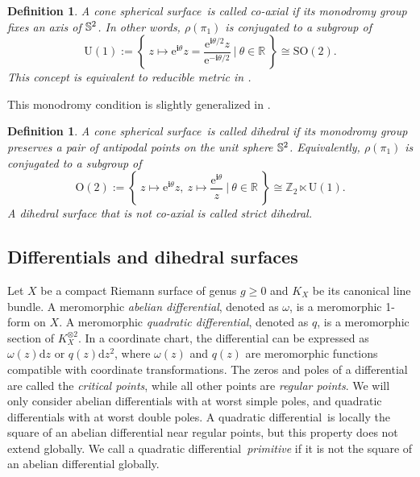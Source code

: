 \documentclass[pdflatex,sn-mathphys]{sn-jnl}%
\numberwithin{equation}{section}
\theoremstyle{thmstyleone}%
\newtheorem{definition}[theorem]{Definition}
\newtheorem{lemma}[theorem]{Lemma}
\newcommand{\RR}{\mathbb{R}}
\newcommand{\ZZ}{\mathbb{Z}}
\newcommand{\ii}{\mathbf{i}}
\newcommand{\STwo}{\mathbb{S}^2}
\newcommand{\Uone}{\mathrm{U}(1)}
\newcommand{\Otwo}{\mathrm{O}(2)}
\newcommand{\qdf}{quadratic differential}
\newcommand{\nbhd}{neighborhood}
\newcommand{\csphsf}{cone spherical surface}
\newcommand{\DEF}{\emph}
\begin{document}
\begin{definition}\label{def:coaxial}
    A \csphsf\ is called \DEF{co-axial} if its monodromy group fixes an axis of ${\Bbb S}^2$. In other words, $\rho(\pi_1)$ is conjugated to a subgroup of
	$$ \Uone := \left\{\ z\mapsto \mathrm{e}^{\ii\theta}z = \frac{\mathrm{e}^{\ii\theta/2}z}{\mathrm{e}^{-\ii\theta/2}} \ \bigg\rvert\ \theta\in\RR \ \right\} \cong \mathrm{SO}(2). $$	
	This concept is equivalent to \DEF{reducible metric} in \cite{UYa00}.
\end{definition}

This monodromy condition is slightly generalized in \cite{SCLX20, GT23}.
\begin{definition}\label{def:dihedral}
    A \csphsf\ is called \DEF{dihedral} if its monodromy group preserves a pair of antipodal points on the unit sphere ${\Bbb S}^2$. Equivalently, $\rho(\pi_1)$ is conjugated to a subgroup of
    $$ \Otwo := \left\{\ z\mapsto \mathrm{e}^{\ii\theta}z,\ z\mapsto \frac{\mathrm{e}^{\ii\theta}}{z} \ \bigg\rvert\ \theta\in\RR \ \right\} \cong \ZZ_2 \ltimes \Uone. $$
    A dihedral surface that is not co-axial is called \DEF{strict dihedral}.
\end{definition}

\newcommand{\Dev}{\overline{D}}
\newcommand{\CUni}{\widetilde{\Sigma_\mathfrak{c}}}


\subsection{Differentials and dihedral surfaces}
Let $X$ be a compact Riemann surface of genus $g\geq0$ and $K_X$ be its canonical line bundle. A meromorphic \DEF{abelian differential}, denoted as $\omega$, is a meromorphic 1-form on $X$. A meromorphic \DEF{\qdf}, denoted as $q$, is a meromorphic section of $K_X^{\otimes 2}$. 
In a coordinate chart, the differential can be expressed as $\omega(z)\mathrm{d}z$ or $q(z)\mathrm{d}z^2$, where $\omega(z)$ and $q(z)$ are meromorphic functions compatible with coordinate transformations.
The zeros and poles of a differential are called the \DEF{critical points}, while all other points are \DEF{regular points}. %
We will only consider abelian differentials with at worst simple poles, and \qdf s with at worst double poles.
A \qdf\ is locally the square of an abelian differential near regular points, %
but this property does not extend globally. We call a \qdf\ \DEF{primitive} if it is not the square of an abelian differential globally.
\end{document}

